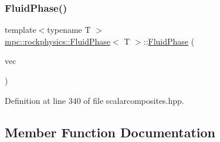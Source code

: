 \subsubsection{\texorpdfstring{Fluid\+Phase()}{FluidPhase()}}
{\footnotesize\ttfamily template$<$typename T $>$ \\
\mbox{\hyperlink{classmpc_1_1rockphysics_1_1_fluid_phase}{mpc\+::rockphysics\+::\+Fluid\+Phase}}$<$ T $>$\+::\mbox{\hyperlink{classmpc_1_1rockphysics_1_1_fluid_phase}{Fluid\+Phase}} (\begin{DoxyParamCaption}\item[{const std\+::vector$<$ std\+::tuple$<$ \mbox{\hyperlink{structmpc_1_1rockphysics_1_1_bulk_modulus_type}{mpc\+::rockphysics\+::\+Bulk\+Modulus\+Type}}$<$ T $>$, \mbox{\hyperlink{structmpc_1_1rockphysics_1_1_shear_modulus_type}{mpc\+::rockphysics\+::\+Shear\+Modulus\+Type}}$<$ T $>$, \mbox{\hyperlink{structmpc_1_1rockphysics_1_1_density_type}{mpc\+::rockphysics\+::\+Density\+Type}}$<$ T $>$, \mbox{\hyperlink{structmpc_1_1rockphysics_1_1_volume_fraction_type}{mpc\+::rockphysics\+::\+Volume\+Fraction\+Type}}$<$ T $>$ $>$ $>$ \&}]{vec }\end{DoxyParamCaption})\hspace{0.3cm}{\ttfamily [inline]}}



Definition at line 340 of file scalarcomposites.\+hpp.



\subsection{Member Function Documentation}
\mbox{\label{classmpc_1_1rockphysics_1_1_fluid_phase_a7f6accc4d8dfd7b8e6f55f3338698121}} 
